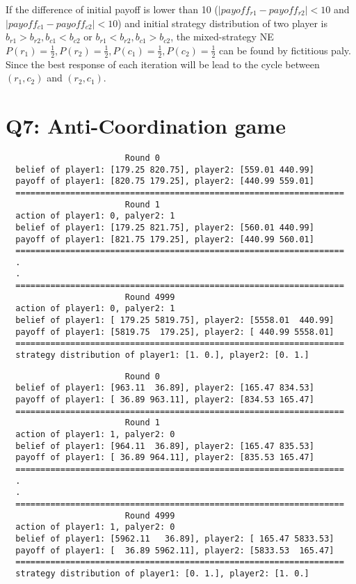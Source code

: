 \documentclass[a4paper, oneside, final, 12pt]{scrartcl} %
\begin{document}
\begingroup
\raggedright
If the difference of initial payoff is lower than 10 
($|payoff_{r1} - payoff_{r2}| < 10$ and $|payoff_{c1} - payoff_{c2}| < 10$)
and initial strategy distribution of two player is 
$b_{r1} > b_{r2}, b_{c1} < b_{c2}$  or  $b_{r1} < b_{r2}, b_{c1} > b_{c2}$, 
the mixed-strategy NE $P(r_1) = \frac{1}{2}, P(r_2) = \frac{1}{2}, 
P(c_1) = \frac{1}{2}, P(c_2) = \frac{1}{2}$ can be found by fictitious paly.
Since the best response of each iteration will be lead to the cycle 
between $(r_1, c_2)$ and $(r_2, c_1)$.
\endgroup

\section{Q7: Anti-Coordination game}

\begin{lstlisting}
                        Round 0
  belief of player1: [179.25 820.75], player2: [559.01 440.99]
  payoff of player1: [820.75 179.25], player2: [440.99 559.01]
  ==================================================================
                        Round 1
  action of player1: 0, palyer2: 1
  belief of player1: [179.25 821.75], player2: [560.01 440.99]
  payoff of player1: [821.75 179.25], player2: [440.99 560.01]
  ==================================================================
  .
  .
  ==================================================================
                        Round 4999
  action of player1: 0, palyer2: 1
  belief of player1: [ 179.25 5819.75], player2: [5558.01  440.99]
  payoff of player1: [5819.75  179.25], player2: [ 440.99 5558.01]
  ==================================================================
  strategy distribution of player1: [1. 0.], player2: [0. 1.]
\end{lstlisting}

\newpage

\begin{lstlisting}
                        Round 0
  belief of player1: [963.11  36.89], player2: [165.47 834.53]
  payoff of player1: [ 36.89 963.11], player2: [834.53 165.47]
  ==================================================================
                        Round 1
  action of player1: 1, palyer2: 0
  belief of player1: [964.11  36.89], player2: [165.47 835.53]
  payoff of player1: [ 36.89 964.11], player2: [835.53 165.47]
  ==================================================================
  .
  .
  ==================================================================
                        Round 4999
  action of player1: 1, palyer2: 0
  belief of player1: [5962.11   36.89], player2: [ 165.47 5833.53]
  payoff of player1: [  36.89 5962.11], player2: [5833.53  165.47]
  ==================================================================
  strategy distribution of player1: [0. 1.], player2: [1. 0.]
\end{lstlisting}
\end{document}
